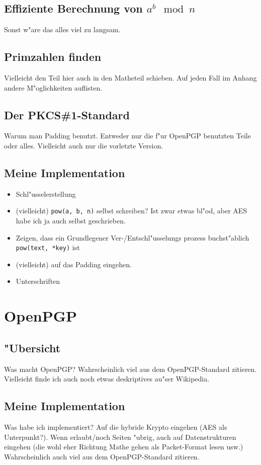 \documentclass[12pt]{article}
\begin{document}
\subsection{Effiziente Berechnung von $a^b \mod n$}
Sonst w"are das alles viel zu langsam.
\subsection{Primzahlen finden}
Vielleicht den Teil hier auch in den Matheteil schieben. Auf jeden Fall im Anhang andere M"oglichkeiten auflisten.
\subsection{Der PKCS\#1-Standard}
Warum man Padding benutzt. Entweder nur die f"ur OpenPGP benutzten Teile oder alles. Vielleicht auch nur die vorletzte Version.
\subsection{Meine Implementation}
\begin{itemize}
\item Schl"usselerstellung
\item (vielleicht) \verb|pow(a, b, n)| selbst schreiben? Ist zwar etwas bl"od, aber AES habe ich ja auch selbst geschrieben.
\item Zeigen, dass ein Grundlegener Ver-/Entschl"usselungs prozess buchst"ablich \verb|pow(text, *key)| ist
\item (vielleicht) auf das Padding eingehen.
\item Unterschriften
\end{itemize}

\section{OpenPGP}
\subsection{"Ubersicht}
Was macht OpenPGP?
Wahrscheinlich viel aus dem OpenPGP-Standard zitieren. Vielleicht finde ich auch noch etwas deskriptives au"ser Wikipedia.
\subsection{Meine Implementation}
Was habe ich implementiert? Auf die hybride Krypto eingehen (AES als Unterpunkt?). Wenn erlaubt/noch Seiten "ubrig, auch auf Datenstrukturen eingehen (die wohl eher Richtung Mathe gehen als Packet-Format lesen usw.)
Wahrscheinlich auch viel aus dem OpenPGP-Standard zitieren.
\end{document}
